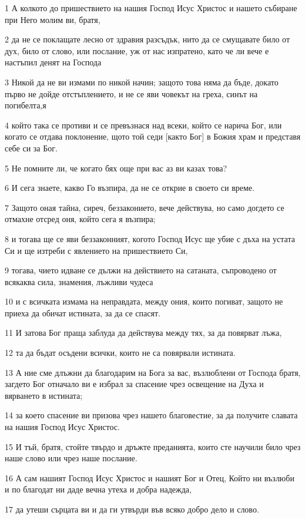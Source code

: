 \par 1 А колкото до пришествието на нашия Господ Исус Христос и нашето събиране при Него молим ви, братя,
\par 2 да не се поклащате лесно от здравия разсъдък, нито да се смущавате било от дух, било от слово, или послание, уж от нас изпратено, като че ли вече е настъпил денят на Господа
\par 3 Никой да не ви измами по никой начин; защото това няма да бъде, докато първо не дойде отстъплението, и не се яви човекът на греха, синът на погибелта,я
\par 4 който така се противи и се превъзнася над всеки, който се нарича Бог, или когато се отдава поклонение, щото той седи [както Бог] в Божия храм и представя себе си за Бог.
\par 5 Не помните ли, че когато бях още при вас аз ви казах това?
\par 6 И сега знаете, какво Го възпира, да не се открие в своето си време.
\par 7 Защото оная тайна, сиреч, беззаконието, вече действува, но само догдето се отмахне отсред оня, който сега я възпира;
\par 8 и тогава ще се яви беззаконният, когото Господ Исус ще убие с дъха на устата Си и ще изтреби с явлението на пришествието Си,
\par 9 тогава, чието идване се дължи на действието на сатаната, съпроводено от всякаква сила, знамения, лъжливи чудеса
\par 10 и с всичката измама на неправдата, между ония, които погиват, защото не приеха да обичат истината, за да се спасят.
\par 11 И затова Бог праща заблуда да действува между тях, за да повярват лъжа,
\par 12 та да бъдат осъдени всички, които не са повярвали истината.
\par 13 А ние сме длъжни да благодарим на Бога за вас, възлюблени от Господа братя, загдето Бог отначало ви е избрал за спасение чрез освещение на Духа и вярването в истината;
\par 14 за което спасение ви призова чрез нашето благовестие, за да получите славата на нашия Господ Исус Христос.
\par 15 И тъй, братя, стойте твърдо и дръжте преданията, които сте научили било чрез наше слово или чрез наше послание.
\par 16 А сам нашият Господ Исус Христос и нашият Бог и Отец, Който ни възлюби и по благодат ни даде вечна утеха и добра надежда,
\par 17 да утеши сърцата ви и да ги утвърди във всяко добро дело и слово.

